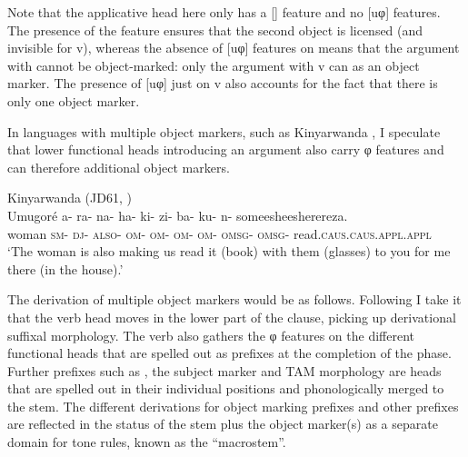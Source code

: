 \documentclass[output=paper]{LSP/langsci}
\begin{document}
Note that the applicative head here only has a [] feature and no [uφ] features. The presence of the  feature ensures that the second object is licensed (and invisible for v), whereas the absence of [uφ] features on  means that the argument  with  cannot be object-marked: only the argument  with v can  as an object marker. The presence of [uφ] just on v also accounts for the fact that there is only one object marker. 

  In languages with multiple object markers, such as Kinyarwanda , I speculate that lower functional heads introducing an argument also carry φ features and can therefore  additional object markers.


\ea\label{ex:vanderwal:29}%
Kinyarwanda (JD61, \citealt[183]{BeaudoinLietzEtAl2004})\\    
\gll Umugoré  a-  ra- na- ha- ki-  zi-  ba-  ku- n- someesheesherereza.\\
     woman  \textsc{sm}- \textsc{dj}{}- \textsc{also}{}- \textsc{om}- \textsc{om}- \textsc{om}- \textsc{om}- \textsc{omsg}- \textsc{omsg}{}-         read.\textsc{caus}.\textsc{caus}.\textsc{appl}.\textsc{appl}\\
    \glt ‘The woman is also making us read it (book) with them (glasses) to you for me there (in the house).’
\z

The derivation of multiple object markers would be as follows. Following \citet{Julien2002} I take it that the  verb head moves in the lower part of the clause, picking up derivational suffixal morphology. The verb also gathers the φ features on the different functional heads that are spelled out as prefixes at the completion of the phase. Further prefixes such as , the subject marker and TAM morphology are heads that are spelled out in their individual positions and phonologically merged to the stem. The different derivations for object marking prefixes and other prefixes are reflected in the status of the stem plus the object marker(s) as a separate domain for tone rules, known as the “macrostem”.
\end{document}
